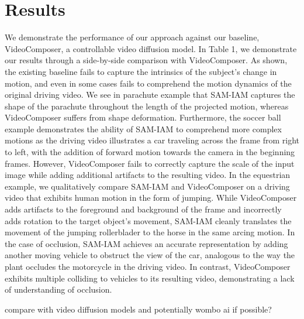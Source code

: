 \section{Results}

We demonstrate the performance of our approach against our baseline, VideoComposer, a controllable video diffusion model. In Table 1, we demonstrate our results through a side-by-side comparison with VideoComposer. As shown, the existing baseline fails to capture the intrinsics of the subject's change in motion, and even in some cases fails to comprehend the motion dynamics of the original driving video. We see in parachute example that SAM-IAM captures the shape of the parachute throughout the length of the projected motion, whereas VideoComposer suffers from shape deformation. Furthermore, the soccer ball example demonstrates the ability of SAM-IAM to comprehend more complex motions as the driving video illustrates a car traveling across the frame from right to left, with the addition of forward motion towards the camera in the beginning frames. However, VideoComposer fails to correctly capture the scale of the input image while adding additional artifacts to the resulting video.
In the equestrian example, we qualitatively compare SAM-IAM and VideoComposer on a driving video that exhibits human motion in the form of jumping. While VideoComposer adds artifacts to the foreground and background of the frame and incorrectly adds rotation to the target object's movement, SAM-IAM cleanly translates the movement of the jumping rollerblader to the horse in the same arcing motion.
In the case of occlusion, SAM-IAM achieves an accurate representation by adding another moving vehicle to obstruct the view of the car, analogous to the way the plant occludes the motorcycle in the driving video. In contrast, VideoComposer exhibits multiple colliding to vehicles to its resulting video, demonstrating a lack of understanding of occlusion. 

compare with video diffusion models and potentially wombo ai if possible?
